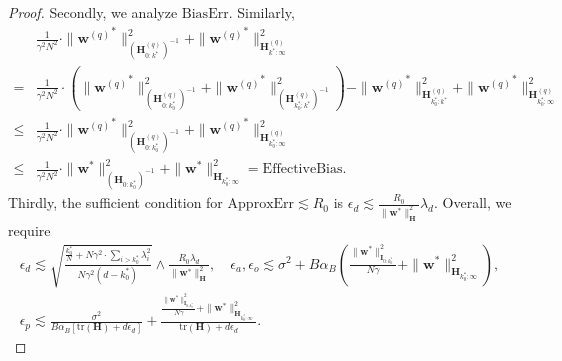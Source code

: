 \documentclass[11pt, letterpaper]{article}
\begin{document}
\begin{proof}
    Secondly, we analyze $\mathrm{BiasErr}$. Similarly,
    \begin{equation*}
        \begin{aligned}
            & \frac{1}{\gamma^2N^2}\cdot\|{\mathbf{w}^{(q)}}^*\|_{(\mathbf{H}_{0:k^*}^{(q)})^{-1}}^2+\|{\mathbf{w}^{(q)}}^*\|_{\mathbf{H}_{k^*:\infty}^{(q)}}^2\\
            =&\frac{1}{\gamma^2N^2}\cdot\left(\|{\mathbf{w}^{(q)}}^*\|_{(\mathbf{H}_{0:k_0^*}^{(q)})^{-1}}^2+\|{\mathbf{w}^{(q)}}^*\|_{(\mathbf{H}_{k_0^*:k^*}^{(q)})^{-1}}^2\right)-\|{\mathbf{w}^{(q)}}^*\|_{\mathbf{H}_{k_0^*:k^*}^{(q)}}^2+\|{\mathbf{w}^{(q)}}^*\|_{\mathbf{H}_{k_0^*:\infty}^{(q)}}^2\\
            \leq &\frac{1}{\gamma^2N^2}\cdot\|{\mathbf{w}^{(q)}}^*\|_{(\mathbf{H}_{0:k_0^*}^{(q)})^{-1}}^2+\|{\mathbf{w}^{(q)}}^*\|_{\mathbf{H}_{k_0^*:\infty}^{(q)}}^2\\
            \leq&\frac{1}{\gamma^2N^2}\cdot\|{\mathbf{w}}^*\|_{(\mathbf{H}_{0:k_0^*})^{-1}}^2+\|{\mathbf{w}}^*\|_{\mathbf{H}_{k_0^*:\infty}}^2=\mathrm{EffectiveBias}.
        \end{aligned}
    \end{equation*}
    Thirdly, the sufficient condition for $\mathrm{ApproxErr}\lesssim R_0$ is $\epsilon_d\lesssim \frac{R_0}{\|\mathbf{w}^*\|_{\mathbf{H}}^2}\lambda_d.$ Overall, we require
    \begin{gather*}
        \epsilon_d\lesssim \sqrt{\frac{\frac{k_0^*}{N}+N\gamma^2\cdot\sum_{i>k_0^*}\lambda_i^2}{N\gamma^2(d-k_0^*)}}\wedge \frac{R_0\lambda_d}{\|\mathbf{w}^*\|_{\mathbf{H}}^2},\quad \epsilon_a,\epsilon_o\lesssim \sigma^2+B\alpha_B\left(\frac{\|{\mathbf{w}}^*\|_{\mathbf{I}_{0:k_0^*}}^2}{N\gamma}+\|{\mathbf{w}}^*\|_{\mathbf{H}_{k_0^*:\infty}}^2\right), \\ 
        \epsilon_p\lesssim \frac{\sigma^2}{B\alpha_B[\mathrm{tr}(\mathbf{H})+d\epsilon_d]}+\frac{\frac{\|{\mathbf{w}}^*\|_{\mathbf{I}_{0:k_0^*}}^2}{N\gamma}+\|{\mathbf{w}}^*\|_{\mathbf{H}_{k_0^*:\infty}}^2}{\mathrm{tr}(\mathbf{H})+d\epsilon_d}.
    \end{gather*}
\end{proof}
\end{document}
